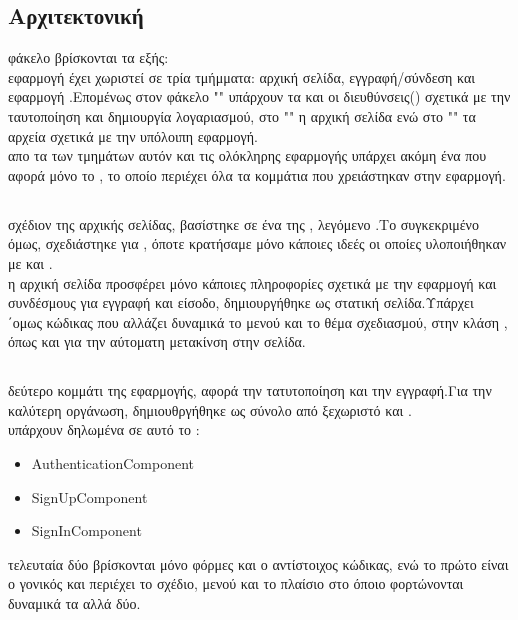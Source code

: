\subsection*{Αρχιτεκτονική}
 φάκελο  βρίσκονται τα εξής:\\
 εφαρμογή έχει χωριστεί σε τρία τμήμματα: αρχική σελίδα, εγγραφή/σύνδεση και εφαρμογή .Επομένως στον φάκελο "" υπάρχουν τα  και οι διευθύνσεις() σχετικά με την ταυτοποίηση και δημιουργία λογαριασμού, στο "" η αρχική σελίδα ενώ στο "" τα αρχεία σχετικά με την υπόλοιπη εφαρμογή.\\
 απο τα  των τμημάτων αυτόν και τις ολόκληρης εφαρμογής υπάρχει ακόμη ένα που αφορά μόνο το , το οποίο περιέχει όλα τα κομμάτια που χρειάστηκαν στην εφαρμογή.

\subsection*{}
 σχέδιον της αρχικής σελίδας, βασίστηκε σε ένα  της , λεγόμενο .Το συγκεκριμένο όμως, σχεδιάστηκε για , όποτε κρατήσαμε μόνο κάποιες ιδεές οι οποίες υλοποιήθηκαν με  και .\\
 η αρχική σελίδα προσφέρει μόνο κάποιες πληροφορίες σχετικά με την εφαρμογή και συνδέσμους για εγγραφή και είσοδο, δημιουργήθηκε ως στατική σελίδα.Υπάρχει ΄ομως κώδικας που αλλάζει δυναμικά το μενού και το θέμα σχεδιασμού, στην κλάση , όπως και για την αύτοματη μετακίνση στην σελίδα.

\subsection*{}
 δεύτερο κομμάτι της εφαρμογής, αφορά την τατυτοποίηση και την εγγραφή.Για την καλύτερη οργάνωση, δημιουθργήθηκε ως σύνολο από ξεχωριστό  και .\\
  υπάρχουν δηλωμένα σε αυτό το :
\begin{itemize}
	\item AuthenticationComponent
	\item SignUpComponent
	\item SignInComponent
\end{itemize}
 τελευταία δύο βρίσκονται μόνο φόρμες και ο αντίστοιχος κώδικας, ενώ το πρώτο είναι ο γονικός  και περιέχει το σχέδιο, μενού και το πλαίσιο στο όποιο φορτώνονται δυναμικά τα αλλά δύο.

